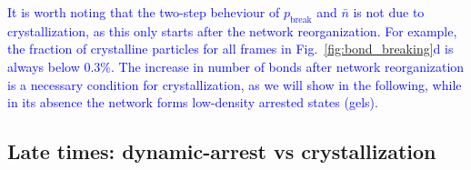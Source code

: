 \documentclass[preprint,amsmath,amssymb,superscriptaddress]{revtex4-1}
\begin{document}
\textcolor{blue}{
It is worth noting that the two-step beheviour of $p_\text{break}$ and $\bar{n}$ is not due to crystallization, as this only starts after the network reorganization. For example, the fraction of crystalline particles for all frames in Fig.~\ref{fig:bond_breaking}d is always below $0.3\%$.
The increase in number of bonds after network reorganization is a necessary condition for crystallization, as we will show in the following, while in its absence the network forms low-density arrested states (gels).
 }
 


\subsection{Late times: dynamic-arrest vs crystallization}
\end{document}
